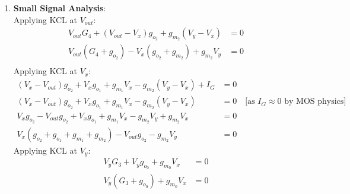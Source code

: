 \begin{enumerate}
\begin{align*}
              &= k_{n_2}\left(V_{y} - V_{x} - V_{th}\right)^2 \cdot \left(1 + \lambda \left(V_{cc} - \frac{I_{M_2}}{G_4} - V_{x}\right)\right) \\
              &= k_{n_2}\left(V_{y} - V_{x} - V_{th}\right)^2 \quad \text{[assuming } \lambda = 0 \text{]} \tag{6} \\
    \end{align*}
    It can be seen that,
    \begin{align*}
      I_{in}  = I_{M_0} &\approx I_{M_1}  \quad \text{[if } k_{n_0} = k_{n_1} \text{]} \\
      I_{out} = I_{M_2} &= I_{M_1} + I_{G} \approx I_{M_1} \quad \text{[as } I_{G} \approx 0 \text{ by MOS physics]}
    \end{align*}
    Thus,
    \begin{align*}
      \frac{I_{out}}{I_{in}} \approx \frac{I_{M_2}}{I_{M_0}} \approx \frac{I_{M_1}}{I_{M_0}} \approx \frac{k_{n_1}}{k_{n_0}} = \frac{\frac{\mu_n C_{ox} W_1}{L_1}}{\frac{\mu_n C_{ox} W_0}{L_0}} = \frac{\frac{W_1}{L_1}}{\frac{W_0}{L_0}} = \frac{W_1 L_0}{L_1 W_0}
    \end{align*}
  \item \textbf{Small Signal Analysis}:\\
    Applying KCL at $V_{out}$:
    \begin{align*}
      V_{out}G_4 + (V_{out} - V_{x})g_{o_2} + g_{m_2}(V_{y} - V_{x}) &= 0 \\
      V_{out}(G_4 + g_{o_2}) - V_{x}(g_{o_2} + g_{m_2}) + g_{m_2}V_{y} &= 0 \tag{7} \\
    \end{align*}
    Applying KCL at $V_{x}$:
    \begin{align*}
      (V_{x} - V_{out})g_{o_2} + V_{x}g_{o_1} + g_{m_1}V_{x} - g_{m_2}(V_{y} - V_{x}) + I_{G} &= 0 \\
      (V_{x} - V_{out})g_{o_2} + V_{x}g_{o_1} + g_{m_1}V_{x} - g_{m_2}(V_{y} - V_{x}) &= 0 \quad \text{[as } I_{G} \approx 0 \text{ by MOS physics]} \\
      V_{x}g_{o_2} - V_{out}g_{o_2} + V_{x}g_{o_1} + g_{m_1}V_{x} - g_{m_2}V_{y} + g_{m_2}V_{x} &= 0 \\
      V_{x}(g_{o_2} + g_{o_1} + g_{m_1} + g_{m_2}) - V_{out}g_{o_2} - g_{m_2}V_{y} &= 0 \tag{8}
    \end{align*}
    Applying KCL at $V_{y}$:
    \begin{align*}
      V_{y}G_3 + V_{y}g_{o_0} + g_{m_0}V_{x} &= 0 \\
      V_{y}(G_3 + g_{o_0}) + g_{m_0}V_{x} &= 0 \tag{9}

\end{align*}
\end{enumerate}
